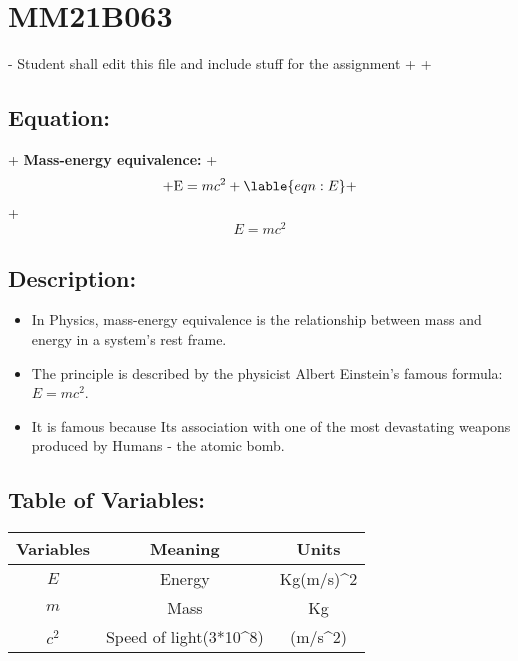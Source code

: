 \section{MM21B063}
- Student shall edit this file and include stuff for the assignment
+
+ \subsection{Equation:}
+ \textbf{Mass-energy equivalence:}
+ \begin{equation}
+        \text{E} = {mc^2}
+        \lable{eqn:E}
+ \end{equation}
+ \[E = mc^2\]
\subsection{Description:}
\begin{itemize}
    \item In Physics, mass-energy equivalence is the relationship between mass and energy in a system's rest frame.
    \item The principle is described by the physicist Albert Einstein's famous formula: $E = mc^2$.
    \item It is famous because Its association with one of the most devastating weapons produced by Humans - the atomic bomb.
\end{itemize}
\subsection{Table of Variables:}
\begin{tabular}{|c|c|c|}
     \hline
     \textbf{Variables} & \textbf{Meaning} & \textbf{Units} \\ \hline
     $E$ & Energy & Kg(m/s)^2 \\ \hline
     $m$ & Mass & Kg \\ \hline
     $c^2$ & Speed of light(3*10^8) & (m/s^2) \\ \hline
\end{tabular}
